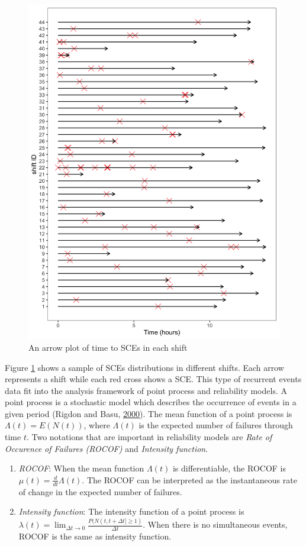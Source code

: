 \documentclass[12pt]{book}
\numberwithin{equation}{chapter}
\providecommand{\tightlist}{%
  \setlength{\itemsep}{0pt}\setlength{\parskip}{0pt}}
\begin{document}
\begin{figure}[!ht]

{\centering \includegraphics[width=0.8\linewidth]{figs/NHPP_arrow_plot} 

}

\caption{An arrow plot of time to SCEs in each shift}\label{fig:arrowplot}
\end{figure}

Figure \ref{fig:arrowplot} shows a sample of SCEs distributions in different shifts. Each arrow represents a shift while each red cross shows a SCE. This type of recurrent events data fit into the analysis framework of point process and reliability models. A point process is a stochastic model which describes the occurrence of events in a given period (Rigdon and Basu, \protect\hyperlink{ref-rigdon2000statistical}{2000}). The mean function of a point process is \(\Lambda(t) = E(N(t))\), where \(\Lambda(t)\) is the expected number of failures through time \(t\). Two notations that are important in reliability models are \emph{Rate of Occurence of Failures (ROCOF)} and \emph{Intensity function}.

\begin{enumerate}
\def\labelenumi{\arabic{enumi}.}
\tightlist
\item
  \emph{ROCOF}: When the mean function \(\Lambda(t)\) is differentiable, the ROCOF is \(\mu(t) = \frac{d}{dt}\Lambda(t)\). The ROCOF can be interpreted as the instantaneous rate of change in the expected number of failures.
\item
  \emph{Intensity function}: The intensity function of a point process is
  \(\lambda(t) = \lim_{\Delta t \rightarrow 0}\frac{P(N(t, t+\Delta t] \geq 1)}{\Delta t}\). When there is no simultaneous events, ROCOF is the same as intensity function.
\end{enumerate}
\end{document}
